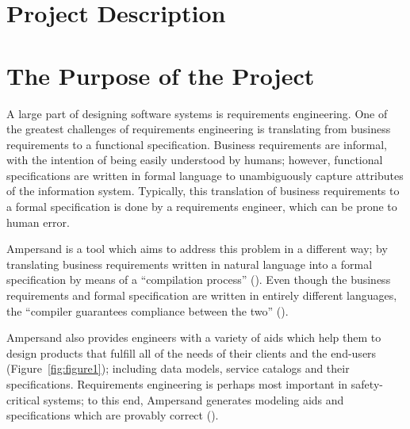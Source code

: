\documentclass[12pt]{report}
\begin{document}
{\section{Project Description}\label{sec:Intro}}
{\section{The Purpose of the Project}\label{sec:Purpose}}
A large part of designing software systems is requirements engineering. One
of the greatest challenges of requirements engineering is translating from
business requirements to a functional specification. Business requirements are
informal, with the intention of being easily understood by humans; however,
functional specifications are written in formal language to unambiguously capture attributes of the 
information system. Typically, this translation
of business requirements to a formal specification is done by a requirements
engineer, which can be prone to human error.

Ampersand is a tool which aims to address this problem in a different way; by
translating business requirements written in natural language into a formal
specification by means of a ``compilation process'' (\cite{derFun}). 
%
%
Even though the business requirements and formal specification are written in
entirely different languages, the ``compiler guarantees compliance between the
two'' (\cite[p.~2]{derFun}). 

Ampersand also provides engineers with a variety of aids which
help them to design products that fulfill all of the needs of their clients and
the end-users (Figure~\ref{fig:figure1}); including data models, service catalogs and their
specifications. Requirements engineering is perhaps most important in
safety-critical systems; to this end, Ampersand generates modeling aids and
specifications which are provably correct (\cite{derFun}). 
\end{document}
